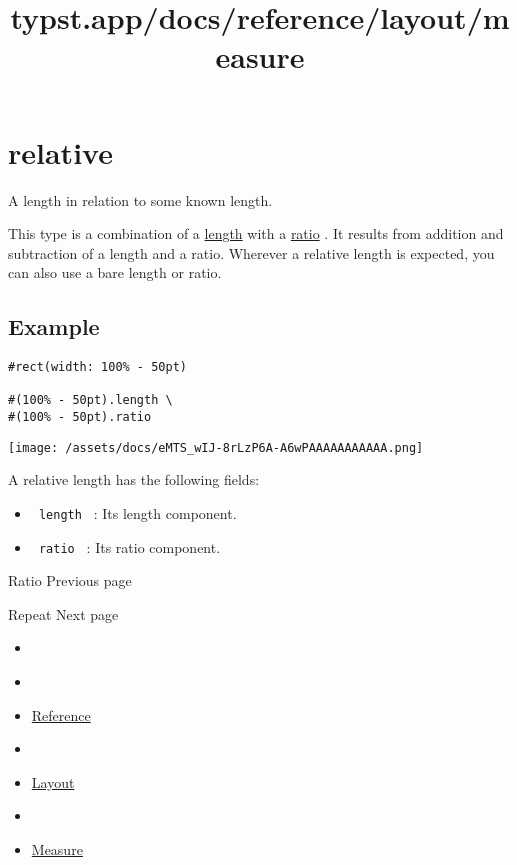 \section{\texorpdfstring{{ relative }}{ relative }}\label{summary}

A length in relation to some known length.

This type is a combination of a
\href{/docs/reference/layout/length/}{length} with a
\href{/docs/reference/layout/ratio/}{ratio} . It results from addition
and subtraction of a length and a ratio. Wherever a relative length is
expected, you can also use a bare length or ratio.

\subsection{Example}\label{example}

\begin{verbatim}
#rect(width: 100% - 50pt)

#(100% - 50pt).length \
#(100% - 50pt).ratio
\end{verbatim}

\texttt{[image: /assets/docs/eMTS\_wIJ-8rLzP6A-A6wPAAAAAAAAAAA.png]}

A relative length has the following fields:

\begin{itemize}
\tightlist
\item
  \texttt{\ length\ } : Its length component.
\item
  \texttt{\ ratio\ } : Its ratio component.
\end{itemize}

\href{/docs/reference/layout/ratio/}{\pandocbounded{}}

{ Ratio } { Previous page }

\href{/docs/reference/layout/repeat/}{\pandocbounded{}}

{ Repeat } { Next page }


\title{typst.app/docs/reference/layout/measure}

\begin{itemize}
\tightlist
\item
  \href{/docs}{}
\item
  
\item
  \href{/docs/reference/}{Reference}
\item
  
\item
  \href{/docs/reference/layout/}{Layout}
\item
  
\item
  \href{/docs/reference/layout/measure/}{Measure}
\end{itemize}

